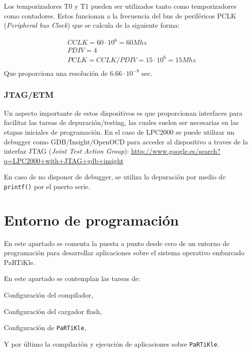 \documentclass[10pt,a4paper]{article}
\newcommand{\partikle}[0]{\texttt{PaRTiKle}}
\newcommand{\hrefx}[1]{\href{#1}{#1}} %
\newenvironment{itemize*}
        {\begin{itemize}%
                \setlength{\parskip}{2pt}%
                \setlength{\itemsep}{0pt}}
        {\end{itemize}}
\begin{document}
	Los temporizadores T0 y T1 pueden ser utilizados tanto como temporizadores como contadores. Estos funcionan a la frecuencia del bus de periféricos PCLK (\emph{Peripheral bus Clock}) que se calcula de la siguiente forma:

	\begin{eqnarray*}
	        & & CCLK = 60 \cdot 10^6 = 60 Mhz \\
	        & & PDIV	= 4 \\
	        & & PCLK = CCLK / PDIV = 15 \cdot 10^6 = 15 Mhz \\
	\end{eqnarray*}
	Que proporciona una resolución de $6.66 \cdot 10^{-8}$ sec.
	
	\subsubsection{JTAG/ETM}

	Un aspecto importante de estos dispositivos es que proporcionan interfaces para facilitar las tareas de depuración/testing, las cuales suelen ser necesarias en las etapas iniciales de programación. En el caso de LPC2000 se puede utilizar un debugger como GDB/Insight/OpenOCD para acceder al dispositivo a traves de la interfaz JTAG (\emph{Joint Test Action Group}): \hrefx{http://www.google.es/search?q=LPC2000+with+JTAG+gdb+insight}

	En caso de no disponer de debugger, se utiliza la depuración por medio de \texttt{printf()} por el puerto serie.

	\newpage
	
	\section{Entorno de programación}
	
	En este apartado se comenta la puesta a punto desde cero de un entorno de programación para desarrollar aplicaciones sobre el sistema operativo embarcado PaRTiKle.
	
	En este apartado se contemplan las tareas de:
	\begin{itemize*}
	\item Configuración del compilador,
	\item Configuración del cargador flash,
	\item Configuración de \partikle{},
	\item Y por último la compilación y ejecución de aplicaciones sobre \partikle{}.
	\end{itemize*}
	
\end{document}
